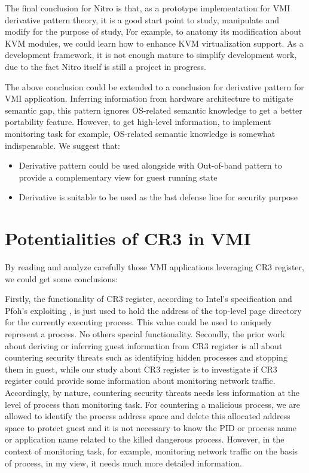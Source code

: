 The final conclusion for Nitro is that, as a prototype implementation for VMI derivative pattern theory, 
it is a good start point to study, manipulate and modify for the purpose of study, For example, 
to anatomy its modification about KVM modules, we could learn how to enhance KVM virtualization support. As a development framework, 
it is not enough mature to simplify development work, due to the fact Nitro itself is still a project in progress.

The above conclusion could be extended to a conclusion for derivative pattern for VMI application. 
Inferring information from hardware architecture to mitigate semantic gap, this pattern ignores OS-related semantic knowledge to 
get a better portability feature. However, to get high-level information, to implement monitoring task for example, OS-related semantic 
knowledge is somewhat indispensable. We suggest that:

\begin{itemize}
    \item Derivative pattern could be used alongside with Out-of-band pattern to provide a complementary view for guest running state
    \item Derivative is suitable to be used as the last defense line for security purpose
\end{itemize}

\section{Potentialities of CR3 in VMI}
By reading and analyze carefully those VMI applications leveraging CR3 register, we could get some conclusions:

Firstly, the functionality of CR3 register, according to Intel’s specification \cite{BookIntelManuel} and Pfoh’s 
exploiting \cite{Reference17}, is just used to hold the address of the top-level page directory for the currently 
executing process. This value could be used to uniquely represent a process. No others special functionality.
Secondly, the prior work about deriving or inferring guest information from CR3 register is all about countering 
security threats such as identifying hidden processes and stopping them in guest, while our study about CR3 register
is to investigate if CR3 register could provide some information about monitoring network traffic. Accordingly, 
by nature, countering security threats needs less information at the level of process than monitoring task. For 
countering a malicious process, we are allowed to identify the process address space and delete this allocated 
address space to protect guest and it is not necessary to know the PID or process name or application name related 
to the killed dangerous process. However, in the context of monitoring task, for example, monitoring network traffic
on the basis of process, in my view, it needs much more detailed information.


